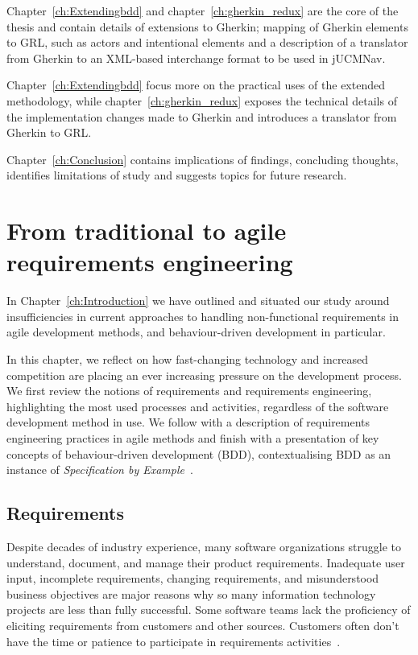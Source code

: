\documentclass[dissertation,final]{softeng}
\begin{document}
{Chapter~\ref{ch:Extendingbdd} and chapter~\ref{ch:gherkin_redux} are the core of the thesis and contain details of extensions to Gherkin; mapping of Gherkin elements to GRL, such as actors and intentional elements and a description of a translator from Gherkin to an XML-based interchange format to be used in jUCMNav.

Chapter~\ref{ch:Extendingbdd} focus more on the practical uses of the extended methodology, while chapter~\ref{ch:gherkin_redux} exposes the technical details of the implementation changes made to Gherkin and introduces a translator from Gherkin to GRL.

Chapter~\ref{ch:Conclusion} contains implications of findings, concluding thoughts, identifies limitations of study and suggests topics for future research.
}
\chapter{From traditional to agile requirements engineering}
\label{ch:Background}
In Chapter~\ref{ch:Introduction} we have outlined and situated our study around insufficiencies in current approaches to handling non-functional requirements in agile development methods, and behaviour-driven development in particular. 

In this chapter, we reflect on how fast-changing technology and increased competition are placing an ever increasing pressure on the development process. We first review the notions of requirements and requirements engineering, highlighting the most used processes and activities, regardless of the software development method in use. We follow with a description of requirements engineering practices in agile methods and finish with a presentation of key concepts of behaviour-driven development (BDD), contextualising BDD as an instance of \emph{Specification by Example}~\citep{Adzic201106}.

\section{Requirements}
\label{sec:requirements}
Despite decades of industry experience, many software organizations struggle to understand, document, and manage their product requirements. Inadequate user input, incomplete requirements, changing requirements, and misunderstood business objectives are major reasons why so many information technology projects are less than fully successful. Some software teams lack the proficiency of eliciting requirements from customers and other sources. Customers often don't have the time or patience to participate in requirements activities~\citep{Wiegers2013}. 
\end{document}
